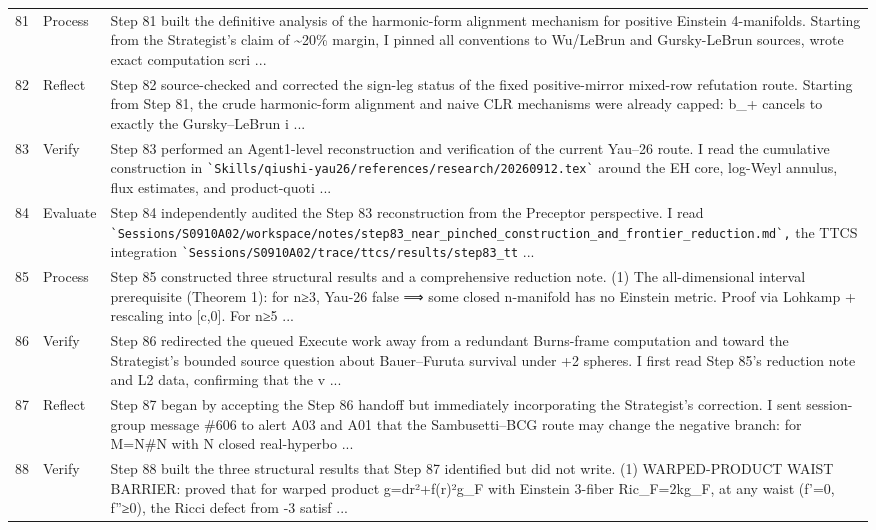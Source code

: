 \documentclass[UTF8,fontset=fandol,zihao=-4]{ctexart}
\begin{document}
\begin{longtable}{r p{} >{\raggedright\arraybackslash}p{}}
81 & Process & Step 81 built the definitive analysis of the harmonic-form alignment mechanism for positive Einstein 4-manifolds. Starting from the Strategist's claim of \textasciitilde{}20\% margin, I pinned all conventions to Wu/LeBrun and Gursky-LeBrun sources, wrote exact computation scri ...\\
82 & Reflect & Step 82 source-checked and corrected the sign-leg status of the fixed positive-mirror mixed-row refutation route. Starting from Step 81, the crude harmonic-form alignment and naive CLR mechanisms were already capped: b\_+ cancels to exactly the Gursky--LeBrun i ...\\
83 & Verify & Step 83 performed an Agent1-level reconstruction and verification of the current Yau--26 route. I read the cumulative construction in \nolinkurl{`Skills/qiushi-yau26/references/research/20260912.tex`} around the EH core, log-Weyl annulus, flux estimates, and product-quoti ...\\
84 & Evaluate & Step 84 independently audited the Step 83 reconstruction from the Preceptor perspective. I read \nolinkurl{`Sessions/S0910A02/workspace/notes/step83_near_pinched_construction_and_frontier_reduction.md`,} the TTCS integration \nolinkurl{`Sessions/S0910A02/trace/ttcs/results/step83_tt} ...\\
85 & Process & Step 85 constructed three structural results and a comprehensive reduction note. (1) The all-dimensional interval prerequisite (Theorem 1): for n≥3, Yau-26 false ⟹ some closed n-manifold has no Einstein metric. Proof via Lohkamp + rescaling into [c,0]. For n≥5 ...\\
86 & Verify & Step 86 redirected the queued Execute work away from a redundant Burns-frame computation and toward the Strategist's bounded source question about Bauer--Furuta survival under +2 spheres. I first read Step 85's reduction note and L2 data, confirming that the v ...\\
87 & Reflect & Step 87 began by accepting the Step 86 handoff but immediately incorporating the Strategist's correction. I sent session-group message \#606 to alert A03 and A01 that the Sambusetti--BCG route may change the negative branch: for M=N\#N with N closed real-hyperbo ...\\
88 & Verify & Step 88 built the three structural results that Step 87 identified but did not write. (1) WARPED-PRODUCT WAIST BARRIER: proved that for warped product g=dr²+f(r)²g\_F with Einstein 3-fiber Ric\_F=2kg\_F, at any waist (f'=0, f''≥0), the Ricci defect from -3 satisf ...\\

\end{longtable}
\end{document}
